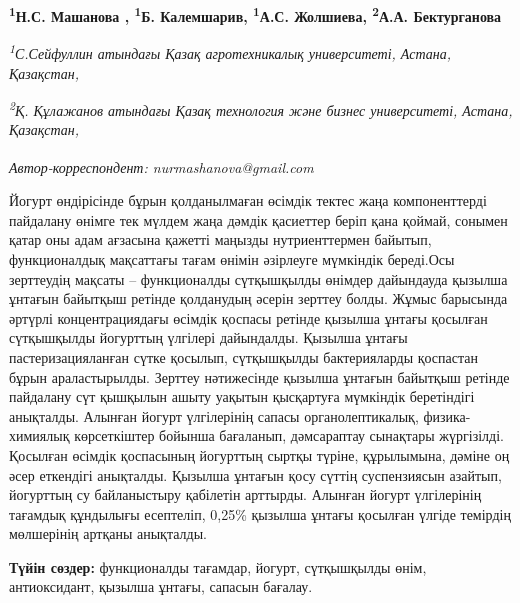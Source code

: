 
\begin{articleheader}

{\bfseries
\textsuperscript{1}Н.С. Машанова\textsuperscript{\envelope } \authorid,
\textsuperscript{1}Б. Калемшарив\authorid,
\textsuperscript{1}А.С. Жолшиева\authorid,
\textsuperscript{2}А.А. Бектурганова\authorid}
\end{articleheader}

\begin{affiliation}
\emph{\textsuperscript{1}С.Сейфуллин атындағы Қазақ агротехникалық университеті, Астана, Қазақстан,}

\emph{\textsuperscript{2}Қ. Құлажанов атындағы Қазақ технология және бизнес университеті, Астана, Қазақстан,}

\raggedright \textsuperscript{\envelope }{\em Автор-корреспондент: nurmashanova@gmail.com}
\end{affiliation}

Йогурт өндірісінде бұрын қолданылмаған өсімдік тектес жаңа
компоненттерді пайдалану өнімге тек мүлдем жаңа дәмдік қасиеттер беріп
қана қоймай, сонымен қатар оны адам ағзасына қажетті маңызды
нутриенттермен байытып, функционалдық мақсаттағы тағам өнімін әзірлеуге
мүмкіндік береді.Осы зерттеудің мақсаты -- функционалды сүтқышқылды
өнімдер дайындауда қызылша ұнтағын байытқыш ретінде қолданудың әсерін
зерттеу болды. Жұмыс барысында әртүрлі концентрациядағы өсімдік қоспасы
ретінде қызылша ұнтағы қосылған сүтқышқылды йогурттың үлгілері
дайындалды. Қызылша ұнтағы пастеризацияланған сүтке қосылып, сүтқышқылды
бактерияларды қоспастан бұрын араластырылды. Зерттеу нәтижесінде қызылша
ұнтағын байытқыш ретінде пайдалану сүт қышқылын ашыту уақытын қысқартуға
мүмкіндік беретіндігі анықталды. Алынған йогурт үлгілерінің сапасы
органолептикалық, физика-химиялық көрсеткіштер бойынша бағаланып,
дәмсараптау сынақтары жүргізілді. Қосылған өсімдік қоспасының йогурттың
сыртқы түріне, құрылымына, дәміне оң әсер еткендігі анықталды. Қызылша
ұнтағын қосу сүттің суспензиясын азайтып, йогурттың су байланыстыру
қабілетін арттырды. Алынған йогурт үлгілерінің тағамдық құндылығы
есептеліп, 0,25\% қызылша ұнтағы қосылған үлгіде темірдің мөлшерінің
артқаны анықталды.

{\bfseries Түйін сөздер:} функционалды тағамдар, йогурт, сүтқышқылды өнім,
антиоксидант, қызылша ұнтағы, сапасын бағалау.


